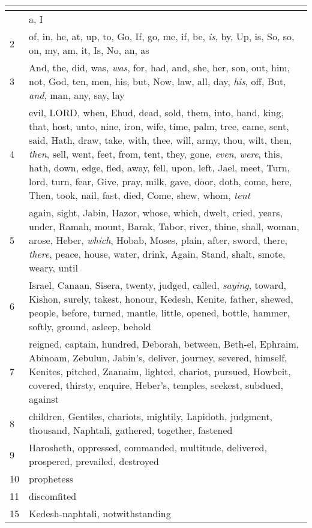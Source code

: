 \begin{center}
\begin{longtable}{l|p{3.75in}}
\hline \multicolumn{2}{c}{{ }} \\ \hline
\endfoot 
1 & a, I\\ \hline 
2 & of, in, he, at, up, to, Go, If, go, me, if, be, \emph{is}, by, Up, is, So, so, on, my, am, it, Is, No, an, as\\ \hline 
3 & And, the, did, was, \emph{was}, for, had, and, she, her, son, out, him, not, God, ten, men, his, but, Now, law, all, day, \emph{his}, off, But, \emph{and}, man, any, say, lay\\ \hline 
4 & evil, LORD, when, Ehud, dead, sold, them, into, hand, king, that, host, unto, nine, iron, wife, time, palm, tree, came, sent, said, Hath, draw, take, with, thee, will, army, thou, wilt, then, \emph{then}, sell, went, feet, from, tent, they, gone, \emph{even}, \emph{were}, this, hath, down, edge, fled, away, fell, upon, left, Jael, meet, Turn, lord, turn, fear, Give, pray, milk, gave, door, doth, come, here, Then, took, nail, fast, died, Come, shew, whom, \emph{tent}\\ \hline 
5 & again, sight, Jabin, Hazor, whose, which, dwelt, cried, years, under, Ramah, mount, Barak, Tabor, river, thine, shall, woman, arose, Heber, \emph{which}, Hobab, Moses, plain, after, sword, there, \emph{there}, peace, house, water, drink, Again, Stand, shalt, smote, weary, until\\ \hline 
6 & Israel, Canaan, Sisera, twenty, judged, called, \emph{saying}, toward, Kishon, surely, takest, honour, Kedesh, Kenite, father, shewed, people, before, turned, mantle, little, opened, bottle, hammer, softly, ground, asleep, behold\\ \hline 
7 & reigned, captain, hundred, Deborah, between, Beth-el, Ephraim, Abinoam, Zebulun, Jabin's, deliver, journey, severed, himself, Kenites, pitched, Zaanaim, lighted, chariot, pursued, Howbeit, covered, thirsty, enquire, Heber's, temples, seekest, subdued, against\\ \hline 
8 & children, Gentiles, chariots, mightily, Lapidoth, judgment, thousand, Naphtali, gathered, together, fastened\\ \hline 
9 & Harosheth, oppressed, commanded, multitude, delivered, prospered, prevailed, destroyed\\ \hline 
10 & prophetess\\ \hline 
11 & discomfited\\ \hline 
15 & Kedesh-naphtali, notwithstanding\\ \hline 
\end{longtable}
\end{center}





